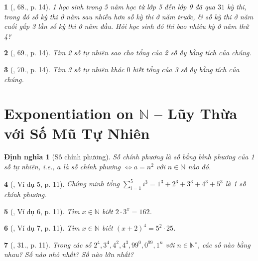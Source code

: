 \documentclass{article}
\newtheorem{baitoan}{}
\newtheorem{dinhnghia}{Định nghĩa}
\begin{document}
\begin{baitoan}[\cite{Binh_Toan_6_tap_1}, 68., p. 14]
	1 học sinh trong 5 năm học từ lớp 5 đến lớp 9 đã qua $31$ kỳ thi, trong đó số kỳ thi ở năm sau nhiều hơn số kỳ thi ở năm trước, \& số kỳ thi ở năm cuối gấp 3 lần số kỳ thi ở năm đầu. Hỏi học sinh đó thi bao nhiêu kỳ ở năm thứ 4?
\end{baitoan}

\begin{baitoan}[\cite{Binh_Toan_6_tap_1}, 69., p. 14]
	Tìm 2 số tự nhiên sao cho tổng của 2 số ấy bằng tích của chúng.
\end{baitoan}

\begin{baitoan}[\cite{Binh_Toan_6_tap_1}, 70., p. 14]
	Tìm 3 số tự nhiên khác $0$ biết tổng của 3 số ấy bằng tích của chúng.
\end{baitoan}


\section{Exponentiation on $\mathbb{N}$ -- Lũy Thừa với Số Mũ Tự Nhiên}

\begin{dinhnghia}[Số chính phương]
	{\rm Số chính phương} là số bằng bình phương của 1 số tự nhiên, i.e., $a$ là số chính phương $\Leftrightarrow a = n^2$ với $n\in\mathbb{N}$ nào đó.
\end{dinhnghia}

\begin{baitoan}[\cite{Tuyen_Toan_6}, Ví dụ 5, p. 11]
	Chứng minh tổng $\sum_{i=1}^5 i^3 = 1^3 + 2^3 + 3^3 + 4^3 + 5^3$ là 1 số chính phương.
\end{baitoan}

\begin{baitoan}[\cite{Tuyen_Toan_6}, Ví dụ 6, p. 11]
	Tìm $x\in\mathbb{N}$ biết $2\cdot3^x = 162$.
\end{baitoan}

\begin{baitoan}[\cite{Tuyen_Toan_6}, Ví dụ 7, p. 11]
	Tìm $x\in\mathbb{N}$ biết $(x + 2)^4 = 5^2\cdot25$.
\end{baitoan}

\begin{baitoan}[\cite{Tuyen_Toan_6}, 31., p. 11]
	Trong các số $2^4,3^4,4^2,4^3,99^0,0^{99},1^n$ với $n\in\mathbb{N}^\star$, các số nào bằng nhau? Số nào nhỏ nhất? Số nào lớn nhất?
\end{baitoan}
\end{document}
